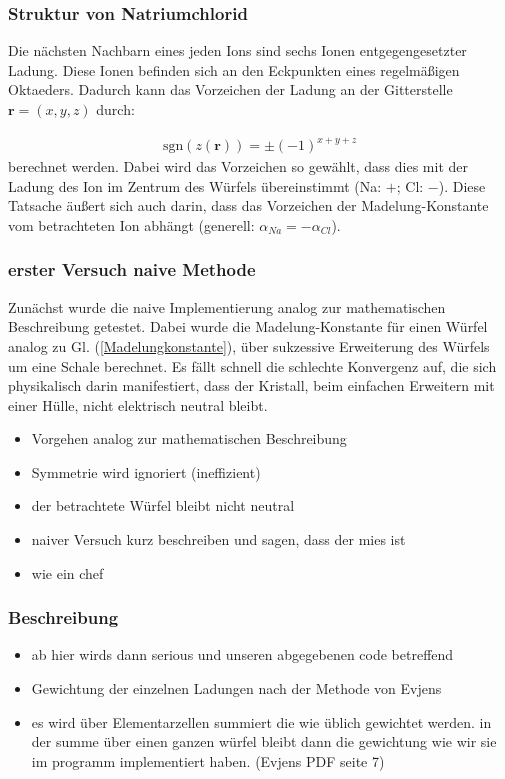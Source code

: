 \documentclass[10pt,a4paper]{article}
\begin{document}
\subsubsection{Struktur von Natriumchlorid}

Die nächsten Nachbarn eines jeden Ions sind sechs Ionen entgegengesetzter Ladung. Diese Ionen befinden sich an den Eckpunkten eines regelmäßigen Oktaeders. Dadurch kann das Vorzeichen der Ladung an der Gitterstelle $\mathbf{r} = \left( x,y,z \right)$ durch:

\begin{align}
\mathrm{sgn}\left(z(\mathbf{r})\right) = \pm \left( -1 \right)^{x+y+z}
\end{align}
berechnet werden. Dabei wird das Vorzeichen so gewählt, dass dies mit der Ladung des Ion im Zentrum des Würfels übereinstimmt (Na: $+$; Cl: $-$). Diese Tatsache äußert sich auch darin, dass das Vorzeichen der Madelung-Konstante vom betrachteten Ion abhängt (generell: $\alpha_{Na} = - \alpha_{Cl}$).
\subsubsection{erster Versuch naive Methode}

Zunächst wurde die naive Implementierung analog zur mathematischen Beschreibung getestet. Dabei wurde die Madelung-Konstante für einen Würfel analog zu Gl. (\ref{Madelungkonstante}), über sukzessive Erweiterung des Würfels um eine Schale berechnet. Es fällt schnell die schlechte Konvergenz auf, die sich physikalisch darin manifestiert, dass der Kristall, beim einfachen Erweitern mit einer Hülle, nicht elektrisch neutral bleibt.

\begin{itemize}
\item Vorgehen analog zur mathematischen Beschreibung
\item Symmetrie wird ignoriert (ineffizient)
\item der betrachtete Würfel bleibt nicht neutral
\item naiver Versuch kurz beschreiben und sagen, dass der mies ist
\item wie ein chef
\end{itemize}

\subsubsection{Beschreibung}

\begin{itemize}
\item ab hier wirds dann serious und unseren abgegebenen code betreffend
\item Gewichtung der einzelnen Ladungen nach der Methode von Evjens\cite{Evjen}
\item es wird über Elementarzellen summiert die wie üblich gewichtet werden. in der summe über einen ganzen würfel bleibt dann die gewichtung wie wir sie im programm implementiert haben. (Evjens PDF seite 7)
\end{itemize}
\end{document}
